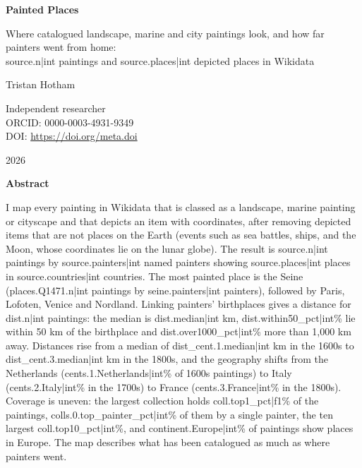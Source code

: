 \documentclass[11pt,a4paper]{article}
\begin{document}
\begin{center}
{\Large\bfseries Painted Places\par}
\vspace{0.4em}
{\large Where catalogued landscape, marine and city paintings look, and how far painters went from home:\\{{source.n|int}} paintings and {{source.places|int}} depicted places in Wikidata\par}
\vspace{1.2em}
{\large Tristan Hotham\par}
\vspace{0.3em}
{\small Independent researcher\\
ORCID: 0000-0003-4931-9349\\
DOI: \href{https://doi.org/{{meta.doi}}}{https://doi.org/{{meta.doi}}}\par}
\vspace{0.8em}
2026
\end{center}

\begin{center}\textbf{Abstract}\end{center}
I map every painting in Wikidata that is classed as a landscape, marine painting or cityscape and that depicts an item with coordinates, after removing depicted items that are not places on the Earth (events such as sea battles, ships, and the Moon, whose coordinates lie on the lunar globe). The result is {{source.n|int}} paintings by {{source.painters|int}} named painters showing {{source.places|int}} places in {{source.countries|int}} countries. The most painted place is the Seine ({{places.Q1471.n|int}} paintings by {{seine.painters|int}} painters), followed by Paris, Lofoten, Venice and Nordland. Linking painters' birthplaces gives a distance for {{dist.n|int}} paintings: the median is {{dist.median|int}} km, {{dist.within50_pct|int}}\% lie within 50 km of the birthplace and {{dist.over1000_pct|int}}\% more than 1,000 km away. Distances rise from a median of {{dist_cent.1.median|int}} km in the 1600s to {{dist_cent.3.median|int}} km in the 1800s, and the geography shifts from the Netherlands ({{cents.1.Netherlands|int}}\% of 1600s paintings) to Italy ({{cents.2.Italy|int}}\% in the 1700s) to France ({{cents.3.France|int}}\% in the 1800s). Coverage is uneven: the largest collection holds {{coll.top1_pct|f1}}\% of the paintings, {{colls.0.top_painter_pct|int}}\% of them by a single painter, the ten largest {{coll.top10_pct|int}}\%, and {{continent.Europe|int}}\% of paintings show places in Europe. The map describes what has been catalogued as much as where painters went.
\end{document}
